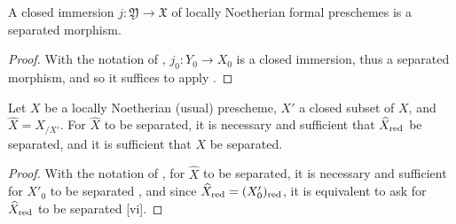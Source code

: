 \begin{proposition}[10.15.6]
\label{1.10.15.6}
A closed immersion $j:\mathfrak{Y}\to\mathfrak{X}$ of locally Noetherian formal preschemes is a separated morphism.
\end{proposition}

\begin{proof}
\label{proof-1.10.15.6}
With the notation of , $j_0:Y_0\to X_0$ is a closed immersion, thus a separated morphism, and so it suffices to apply .
\end{proof}

\begin{proposition}[10.15.7]
\label{1.10.15.7}
Let $X$ be a locally Noetherian (usual) prescheme, $X'$ a closed subset of $X$, and $\widehat{X}=X_{/X'}$.
For $\widehat{X}$ to be separated, it is necessary and sufficient that $\widehat{X}_{\mathrm{red}}$ be separated, and it is sufficient that $X$ be separated.
\end{proposition}

\begin{proof}
\label{proof-1.10.15.7}
With the notation of , for $\widehat{X}$ to be separated, it is necessary and sufficient for $X'_0$ to be separated , and since $\widehat{X}_{\mathrm{red}}=(X'_0)_{\mathrm{red}}$, it is equivalent to ask for $\widehat{X}_{\mathrm{red}}$ to be separated [vi].
\end{proof}
